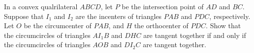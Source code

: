 In a convex qualrilateral $ABCD$,  let $P$ be the intersection point of $AD$ and $BC$. Suppose that $I_1$ and $I_2$ are the incenters of triangles $PAB$ and $PDC$, respectively. Let $O$ be the circumcenter of $PAB$,  and $H$ the orthocenter of $PDC$. Show that the circumcircles of triangles $AI_1B$ and $DHC$ are tangent together if and only if the circumcircles of triangles $AOB$ and $DI_2C$ are tangent together.